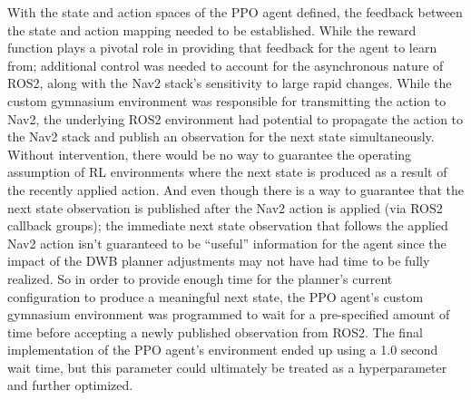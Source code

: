 \documentclass[conference]{IEEEtran}
\begin{document}
        With the state and action spaces of the PPO agent defined, the feedback between the state and action mapping needed to be established. While the reward function plays a pivotal role in providing that feedback for the agent to learn from; additional control was needed to account for the asynchronous nature of ROS2, along with the Nav2 stack's sensitivity to large rapid changes. While the custom gymnasium environment was responsible for transmitting the action to Nav2, the underlying ROS2 environment had potential to propagate the action to the Nav2 stack and publish an observation for the next state simultaneously. Without intervention, there would be no way to guarantee the operating assumption of RL environments where the next state is produced as a result of the recently applied action. And even though there is a way to guarantee that the next state observation is published after the Nav2 action is applied (via ROS2 callback groups); the immediate next state observation that follows the applied Nav2 action isn't guaranteed to be ``useful'' information for the agent since the impact of the DWB planner adjustments may not have had time to be fully realized. So in order to provide enough time for the planner's current configuration to produce a meaningful next state, the PPO agent's custom gymnasium environment was programmed to wait for a pre-specified amount of time before accepting a newly published observation from ROS2. The final implementation of the PPO agent's environment ended up using a 1.0 second wait time, but this parameter could ultimately be treated as a hyperparameter and further optimized.  
\end{document}
